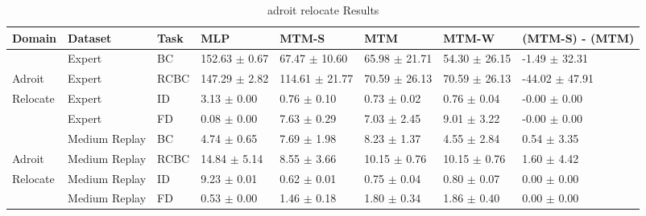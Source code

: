 \begin{table*}
  \small
  \caption{adroit relocate Results}
  \label{tab:adroit_relocate}
  \centering
  \begin{tabular}{l l l l l l l l}
    \toprule
  Domain &       Dataset & Task &               MLP &              MTM-S &               MTM &             MTM-W &                                     (MTM-S) - (MTM) \\
    \midrule
         &        Expert &   BC & 152.63 $\pm$ 0.67 &  67.47 $\pm$ 10.60 & 65.98 $\pm$ 21.71 & 54.30 $\pm$ 26.15 &  \textcolor[rgb]{0.73,0.00,0.00}{-1.49 $\pm$ 32.31} \\
  Adroit &        Expert & RCBC & 147.29 $\pm$ 2.82 & 114.61 $\pm$ 21.77 & 70.59 $\pm$ 26.13 & 70.59 $\pm$ 26.13 & \textcolor[rgb]{1.00,0.00,0.00}{-44.02 $\pm$ 47.91} \\
Relocate &        Expert &   ID &   3.13 $\pm$ 0.00 &    0.76 $\pm$ 0.10 &   0.73 $\pm$ 0.02 &   0.76 $\pm$ 0.04 &                                    -0.00 $\pm$ 0.00 \\
         &        Expert &   FD &   0.08 $\pm$ 0.00 &    7.63 $\pm$ 0.29 &   7.03 $\pm$ 2.45 &   9.01 $\pm$ 3.22 &                                    -0.00 $\pm$ 0.00 \\
    \midrule
         & Medium Replay &   BC &   4.74 $\pm$ 0.65 &    7.69 $\pm$ 1.98 &   8.23 $\pm$ 1.37 &   4.55 $\pm$ 2.84 &    \textcolor[rgb]{0.00,0.50,0.00}{0.54 $\pm$ 3.35} \\
  Adroit & Medium Replay & RCBC &  14.84 $\pm$ 5.14 &    8.55 $\pm$ 3.66 &  10.15 $\pm$ 0.76 &  10.15 $\pm$ 0.76 &    \textcolor[rgb]{0.00,0.50,0.00}{1.60 $\pm$ 4.42} \\
Relocate & Medium Replay &   ID &   9.23 $\pm$ 0.01 &    0.62 $\pm$ 0.01 &   0.75 $\pm$ 0.04 &   0.80 $\pm$ 0.07 &    \textcolor[rgb]{0.00,0.00,0.00}{0.00 $\pm$ 0.00} \\
         & Medium Replay &   FD &   0.53 $\pm$ 0.00 &    1.46 $\pm$ 0.18 &   1.80 $\pm$ 0.34 &   1.86 $\pm$ 0.40 &    \textcolor[rgb]{0.00,0.00,0.00}{0.00 $\pm$ 0.00} \\
    \midrule
    \bottomrule
  \end{tabular}
\end{table*}
